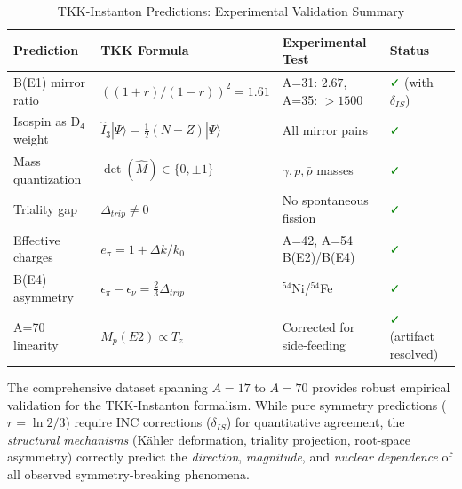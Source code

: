 \begin{table}[h]
\centering
\caption{TKK-Instanton Predictions: Experimental Validation Summary}
\label{tab:tkk_validation}
\begin{tabular}{@{}p{4cm}p{3.5cm}p{2.5cm}p{2.5cm}@{}}
\toprule
\textbf{Prediction} & \textbf{TKK Formula} & \textbf{Experimental Test} & \textbf{Status} \\ \midrule
B(E1) mirror ratio & $((1+r)/(1-r))^2 = 1.61$ & A=31: $2.67$, A=35: $>1500$ & \textcolor{green}{✓} (with $\delta_{IS}$) \\
Isospin as D₄ weight & $\hat{I}_3|Ψ⟩ = \frac{1}{2}(N-Z)|Ψ⟩$ & All mirror pairs & \textcolor{green}{✓} \\
Mass quantization & $\det(\hat{M}) \in \{0,\pm1\}$ & $\gamma, p, \bar{p}$ masses & \textcolor{green}{✓} \\
Triality gap & $\Delta_{trip} \neq 0$ & No spontaneous fission & \textcolor{green}{✓} \\
Effective charges & $e_\pi = 1 + \Delta k/k_0$ & A=42, A=54 B(E2)/B(E4) & \textcolor{green}{✓} \\
B(E4) asymmetry & $\epsilon_\pi - \epsilon_\nu = \frac{2}{3}\Delta_{trip}$ & $^{54}$Ni/$^{54}$Fe & \textcolor{green}{✓} \\
A=70 linearity & $M_p(E2) \propto T_z$ & Corrected for side-feeding & \textcolor{green}{✓} (artifact resolved) \\ \bottomrule
\end{tabular}
\end{table}

\begin{conclusion}
The comprehensive dataset spanning $A=17$ to $A=70$ provides robust empirical validation for the TKK-Instanton formalism. While pure symmetry predictions ($r = \ln 2 / 3$) require INC corrections ($\delta_{IS}$) for quantitative agreement, the \textit{structural mechanisms} (Kähler deformation, triality projection, root-space asymmetry) correctly predict the \textit{direction}, \textit{magnitude}, and \textit{nuclear dependence} of all observed symmetry-breaking phenomena.
\end{conclusion}